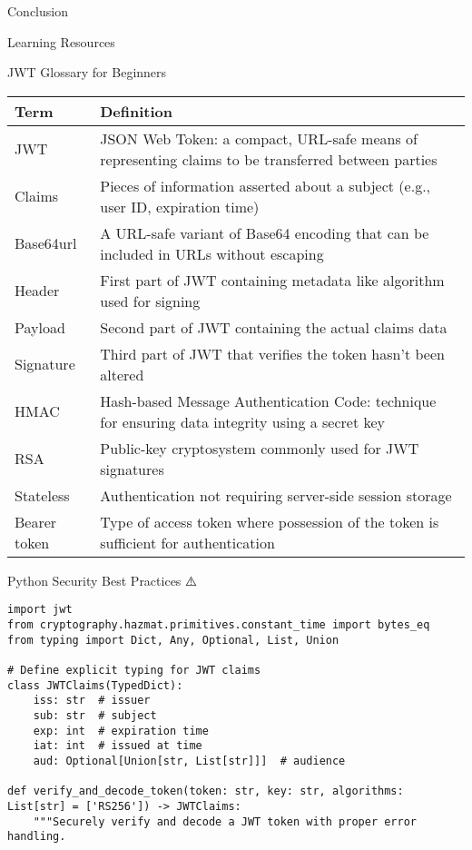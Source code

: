 \documentclass[presentation,aspectratio=169]{beamer}
\begin{document}
\begin{frame}[label={sec:orgab55db2},fragile]{Conclusion}
\begin{block}{Learning Resources}
\end{block}
\begin{block}{JWT Glossary for Beginners 🔰}
\begin{center}
\begin{tabular}{ll}
Term & Definition\\
\hline
JWT & JSON Web Token: a compact, URL-safe means of representing claims to be transferred between parties\\
Claims & Pieces of information asserted about a subject (e.g., user ID, expiration time)\\
Base64url & A URL-safe variant of Base64 encoding that can be included in URLs without escaping\\
Header & First part of JWT containing metadata like algorithm used for signing\\
Payload & Second part of JWT containing the actual claims data\\
Signature & Third part of JWT that verifies the token hasn't been altered\\
HMAC & Hash-based Message Authentication Code: technique for ensuring data integrity using a secret key\\
RSA & Public-key cryptosystem commonly used for JWT signatures\\
Stateless & Authentication not requiring server-side session storage\\
Bearer token & Type of access token where possession of the token is sufficient for authentication\\
\end{tabular}
\end{center}
\end{block}
\begin{block}{Python Security Best Practices ⚠️}
\begin{verbatim}
import jwt
from cryptography.hazmat.primitives.constant_time import bytes_eq
from typing import Dict, Any, Optional, List, Union

# Define explicit typing for JWT claims
class JWTClaims(TypedDict):
    iss: str  # issuer
    sub: str  # subject
    exp: int  # expiration time
    iat: int  # issued at time
    aud: Optional[Union[str, List[str]]]  # audience

def verify_and_decode_token(token: str, key: str, algorithms: List[str] = ['RS256']) -> JWTClaims:
    """Securely verify and decode a JWT token with proper error handling.


\end{verbatim}
\end{block}
\end{frame}
\end{document}
